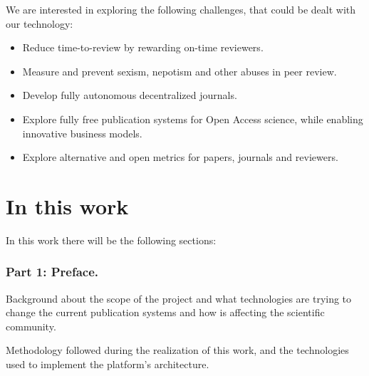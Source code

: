 We are interested in exploring the following challenges, that could be dealt
with our technology:
\begin{itemize}
\item Reduce time-to-review by rewarding on-time reviewers.
\item Measure and prevent sexism, nepotism and other abuses in peer review.
\item Develop fully autonomous decentralized journals.
\item Explore fully free publication systems for Open Access science, while
  enabling innovative business models.
\item Explore alternative and open metrics for papers, journals and reviewers.
\end{itemize}

  \section{In this work}
  In this work there will be the following sections:

  \subsubsection*{Part 1: Preface.}
  \begin{itemize}
     Background about the scope of the
    project and what technologies are trying to change the current publication
    systems and how is affecting the scientific community.

    Methodology followed during the
    realization of this work, and the technologies used to implement the
    platform's architecture.
  \end{itemize}
